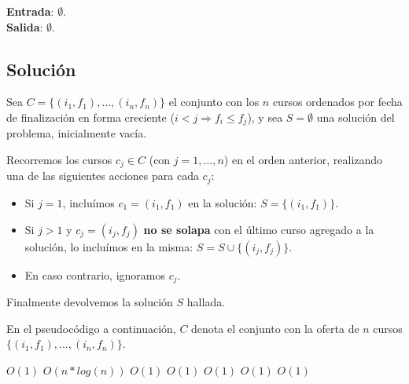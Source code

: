 \documentclass[a4paper, 10pt, twoside]{article}
\newenvironment{pseudo}[1][]{%
    \vspace{0.5em}%
    \begin{algorithmic}%
}
{%
    \end{algorithmic}%
    \vspace{0.5em}%
}
\newcommand{\To}{\textbf{to} }
\newcommand{\Ode}[1]{\hfill $O(#1)$}
\begin{document}
\textbf{Entrada}: $\emptyset$.\\
\textbf{Salida}: $\emptyset$.


\subsection{Solución}

Sea $C = \{ (i_1, f_1), \ldots, (i_n, f_n) \}$ el conjunto con los $n$ cursos ordenados por fecha de finalización en forma creciente ($i < j \Rightarrow f_i \leq f_j$), y sea $S = \emptyset$ una solución del problema, inicialmente vacía.

Recorremos los cursos $c_j \in C$ (con $j = 1, \ldots, n$) en el orden anterior, realizando una de las siguientes acciones para cada $c_j$:

\begin{itemize}
    \item{
        Si $j = 1$, incluímos $c_1 = (i_1, f_1)$ en la solución: $S = \{ (i_1, f_1) \}$.
    }
    \item{
        Si $j > 1$ y $c_j = (i_j, f_j)$ \textbf{no se solapa} con el último curso agregado a la solución, lo incluímos en la misma: $S = S \cup \{ (i_j, f_j) \}$.
    }
    \item{
        En caso contrario, ignoramos $c_j$.
    }
\end{itemize}

Finalmente devolvemos la solución $S$ hallada.

En el pseudocódigo a continuación, $C$ denota el conjunto con la oferta de $n$ cursos $\{ (i_1, f_1), \ldots, (i_n, f_n) \}$.

\begin{pseudo}
                                            \Ode{1}
        \Else
                                     \Ode{n * log(n)}
                                    \Ode{1}
                                                 \Ode{1}
            \For{$j = 2$ \To $|C|$}                            
                                                \Ode{1}
                           \Ode{1}
                                                 \Ode{1}
                \EndIf
            \EndFor
        \EndIf
    \EndProcedure 
\end{pseudo}
\end{document}
